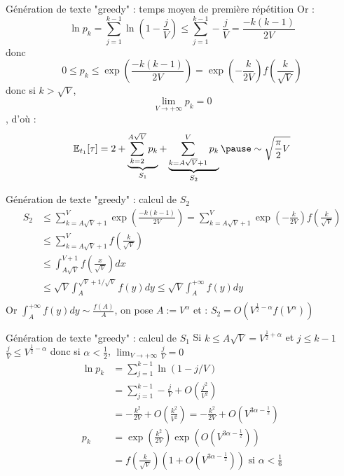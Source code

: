 \documentclass[t]{beamer}
\begin{document}
\begin{frame}{Génération de texte "greedy" : temps moyen de première répétition} %
    Or :
    \[
        \ln p_k = \sum_{j=1}^{k-1} \ln(1-\frac{j}{V}) \leq \sum_{j=1}^{k-1} -\frac{j}{V} = \frac{-k(k-1)}{2V}
    \] 
    donc 
    \[
        0 \leq p_k \leq \exp(\frac{-k(k-1)}{2V}) = \exp(-\frac{k}{2V}) f(\frac{k}{\sqrt{V}})
    \]
    donc si $k>\sqrt{V}$, \hspace{0.2cm}  $$\lim_{V \longrightarrow + \infty} p_k = 0$$, d'où :
    \[
        \mathbb{E}_{t_1}[\tau] = 2 + \underbrace{\sum_{k=2}^{A\sqrt{V}} p_k}_{S_1} + \underbrace{\sum_{k=A\sqrt{V}+1}^{V} p_k}_{S_2} \pause \sim \sqrt{\frac{\pi}{2}V} 
    \]
\end{frame}

\begin{frame}{Génération de texte "greedy" : calcul de $S_2$} %
    \begin{align*}
        S_2 &\leq \sum_{k=A\sqrt{V}+1}^{V} \exp(\frac{-k(k-1)}{2V}) = \sum_{k=A\sqrt{V}+1}^{V} \exp(-\frac{k}{2V}) f(\frac{k}{\sqrt{V}}) \\ 
        &\leq \sum_{k=A\sqrt{V}+1}^{V} f(\frac{k}{\sqrt{V}}) \\
        &\leq \int_{A\sqrt{V}}^{V+1} f(\frac{x}{\sqrt{V}}) dx \\ %
        &\leq \sqrt{V} \int_{A}^{\sqrt{V} + 1/\sqrt{V}} f(y) dy \leq \sqrt{V} \int_{A}^{+ \infty} f(y) dy \\ %
    \end{align*}
    Or $\int_{A}^{+ \infty} f(y) dy \sim \frac{f(A)}{A}$, on pose $A:=V^{\alpha}$ et : $S_2 = O(V^{\frac{1}{2} - \alpha} f(V^{\alpha}))  $
\end{frame}

\begin{frame}{Génération de texte "greedy" : calcul de $S_1 $} %
    Si $k \leq A\sqrt{V} = V^{\frac{1}{2} + \alpha}$ et $j\leq k-1$ \\
    $\frac{j}{V} \leq V^{\frac{1}{2} - \alpha}$ donc si $\alpha < \frac{1}{2}$, $\lim_{V \longrightarrow + \infty} \frac{j}{V} = 0$ \\
    \begin{align*}
        \ln p_k &= \sum_{j=1}^{k-1} \ln(1 - j/V) \\
        & = \sum_{j=1}^{k-1} - \frac{j}{V} + O(\frac{j^2}{V^2}) \\
        & = - \frac{k^2}{2V} + O(\frac{k^2}{V^2}) = - \frac{k^2}{2V} + O(V^{3\alpha - \frac{1}{2}}) \\
        p_k &= \exp(\frac{k^2}{2V}) \exp(O(V^{3\alpha - \frac{1}{2}})) \\
        &= f(\frac{k}{\sqrt{V}}) (1 + O(V^{3\alpha - \frac{1}{2}})) \text{  si } \alpha < \frac{1}{6} %
    \end{align*}
\end{frame}
\end{document}
